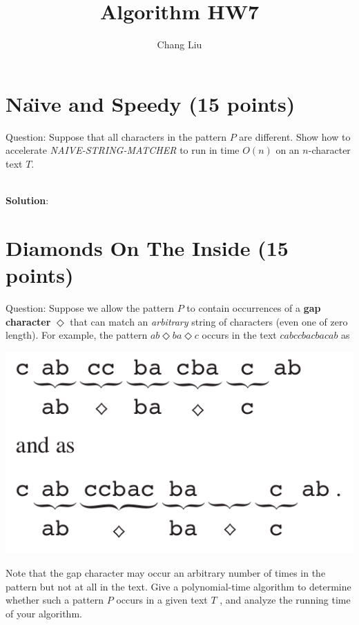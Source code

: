 \documentclass{article}
\author{Chang Liu}
\title{Algorithm HW7}
\begin{document}

\pagestyle{main}

\section{Na\"{\i}ve and Speedy (15 points)}
Question: Suppose that all characters in the pattern $P$ are different. Show how to accelerate \emph{NAIVE-STRING-MATCHER} to run in time $O(n)$ on an $n$-character text $T$.

~\\
\textbf{Solution}:\newline
\indent 




\section{Diamonds On The Inside (15 points)}
Question: Suppose we allow the pattern $P$ to contain occurrences of a \textbf{gap character} $\Diamond$ that can match an \emph{arbitrary} string of characters (even one of zero length). For example, the pattern $ab\Diamond{ba}\Diamond{c}$ occurs in the text $cabccbacbacab$ as

\begin{center} %
\includegraphics[scale=0.3]{p2.png} %
\end{center}

\noindent Note that the gap character may occur an arbitrary number of times in the pattern but not at all in the text. Give a polynomial-time algorithm to determine whether such a pattern $P$ occurs in a given text $T$ , and analyze the running time of your algorithm.
\end{document}
